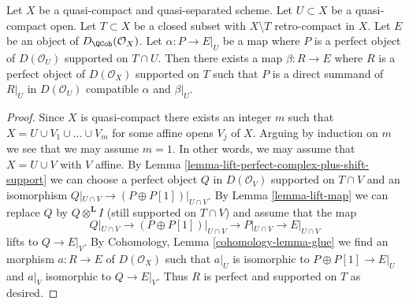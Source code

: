 \begin{lemma}
\label{lemma-lift-map-from-perfect-complex-with-support}
Let $X$ be a quasi-compact and quasi-separated scheme.
Let $U \subset X$ be a quasi-compact open. Let $T \subset X$
be a closed subset with $X \setminus T$ retro-compact in $X$.
Let $E$ be an object of $D_\QCoh(\mathcal{O}_X)$.
Let $\alpha : P \to E|_U$ be a map where $P$ is a perfect object of
$D(\mathcal{O}_U)$ supported on $T \cap U$. Then there exists a map
$\beta : R \to E$ where $R$ is a perfect object of $D(\mathcal{O}_X)$
supported on $T$ such that $P$ is a direct summand of $R|_U$ in
$D(\mathcal{O}_U)$ compatible $\alpha$ and $\beta|_U$.
\end{lemma}

\begin{proof}
Since $X$ is quasi-compact there exists an integer $m$ such that
$X = U \cup V_1 \cup \ldots \cup V_m$ for some affine opens $V_j$ of $X$.
Arguing by induction on $m$ we see that we may assume $m = 1$. In other
words, we may assume that $X = U \cup V$ with $V$ affine. By
Lemma \ref{lemma-lift-perfect-complex-plus-shift-support}
we can choose a perfect object $Q$ in $D(\mathcal{O}_V)$
supported on $T \cap V$ and an isomorphism
$Q|_{U \cap V} \to (P \oplus P[1])|_{U \cap V}$.
By Lemma \ref{lemma-lift-map} we can replace $Q$ by
$Q \otimes^\mathbf{L} I$ (still supported on $T \cap V$)
and assume that the map
$$
Q|_{U \cap V} \to (P \oplus P[1])|_{U \cap V}
\longrightarrow P|_{U \cap V}
\longrightarrow
E|_{U \cap V}
$$
lifts to $Q \to E|_V$. By
Cohomology, Lemma \ref{cohomology-lemma-glue}
we find an morphism $a : R \to E$ of $D(\mathcal{O}_X)$
such that $a|_U$ is isomorphic to $P \oplus P[1] \to E|_U$
and $a|_V$ isomorphic to $Q \to E|_V$.
Thus $R$ is perfect and supported on $T$ as desired.
\end{proof}
